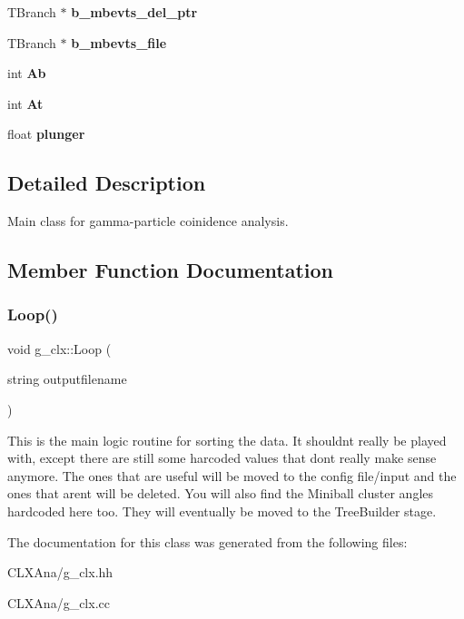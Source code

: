 \begin{DoxyCompactItemize}
T\+Branch $\ast$ {\bfseries b\+\_\+mbevts\+\_\+del\+\_\+ptr}
\item 
\mbox{\label{classg__clx_a59f6b47f4c944b311e6dd5a0abb103c5}} 
T\+Branch $\ast$ {\bfseries b\+\_\+mbevts\+\_\+file}
\item 
\mbox{\label{classg__clx_a3ecad3ddd660369644dafb28e0bfe26d}} 
int {\bfseries Ab}
\item 
\mbox{\label{classg__clx_a357526f9a06f3059124825bbf6c7a790}} 
int {\bfseries At}
\item 
\mbox{\label{classg__clx_aee52e53d2cd780936d648225402d8bcf}} 
float {\bfseries plunger}
\end{DoxyCompactItemize}


\subsection{Detailed Description}
Main class for gamma-\/particle coinidence analysis. 

\subsection{Member Function Documentation}
\mbox{\label{classg__clx_a9d5de859df4bfbb746726661ff1d24a9}} 
\subsubsection{\texorpdfstring{Loop()}{Loop()}}
{\footnotesize\ttfamily void g\+\_\+clx\+::\+Loop (\begin{DoxyParamCaption}\item[{string}]{outputfilename }\end{DoxyParamCaption})\hspace{0.3cm}{\ttfamily [virtual]}}

This is the main logic routine for sorting the data. It shouldn\textquotesingle{}t really be played with, except there are still some harcoded values that don\textquotesingle{}t really make sense anymore. The ones that are useful will be moved to the config file/input and the ones that aren\textquotesingle{}t will be deleted. You will also find the Miniball cluster angles hardcoded here too. They will eventually be moved to the Tree\+Builder stage. 

The documentation for this class was generated from the following files\+:\begin{DoxyCompactItemize}
\item 
C\+L\+X\+Ana/g\+\_\+clx.\+hh\item 
C\+L\+X\+Ana/g\+\_\+clx.\+cc\end{DoxyCompactItemize}
